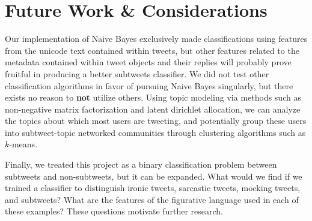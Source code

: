 \documentclass[11pt, twoside, reqno]{book}
\begin{document}
\section{Future Work \& Considerations}
\label{future_work_and_considerations}

Our implementation of Naive Bayes exclusively made classifications using features from the unicode text contained within tweets, but other features related to the metadata contained within tweet objects and their replies will probably prove fruitful in producing a better subtweets classifier. We did not test other classification algorithms in favor of pursuing Naive Bayes singularly, but there exists no reason to \textbf{not} utilize others. Using topic modeling via methods such as non-negative matrix factorization and latent dirichlet allocation, we can analyze the topics about which most users are tweeting, and potentially group these users into subtweet-topic networked communities through clustering algorithms such as $k$-means.

Finally, we treated this project as a binary classification problem between subtweets and non-subtweets, but it can be expanded. What would we find if we trained a classifier to distinguish ironic tweets, sarcastic tweets, mocking tweets, and subtweets? What are the features of the figurative language used in each of these examples? These questions motivate further research.
\end{document}
